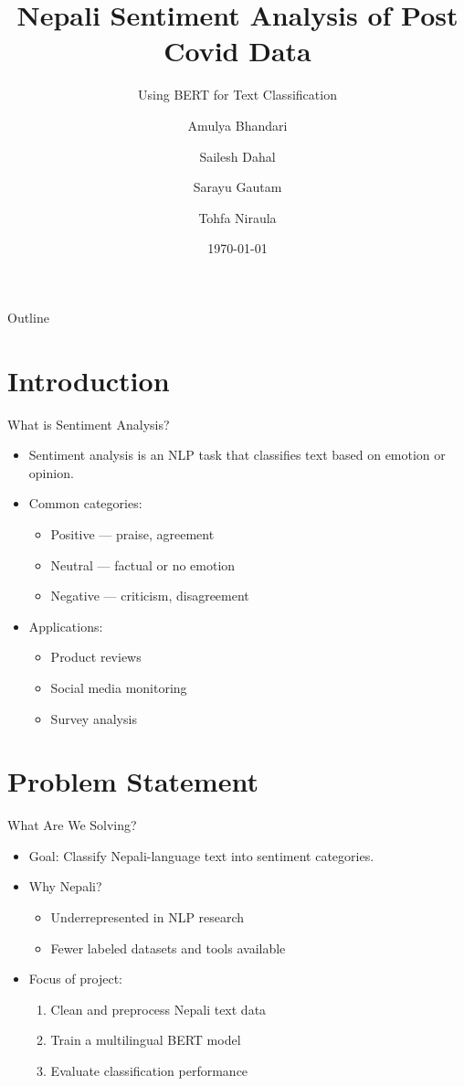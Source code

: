 \documentclass[aspectratio=169]{beamer}
\title{Nepali Sentiment Analysis of Post Covid Data}
\subtitle{Using BERT for Text Classification}
\author{Amulya Bhandari \and Sailesh Dahal \and Sarayu Gautam \and Tohfa Niraula}
\institute{Department of Computer Engineering\\Kathmandu University}
\date{\today}
\begin{document}
\maketitle

\begin{frame}{Outline}
  \tableofcontents
\end{frame}

\section{Introduction}
\begin{frame}{What is Sentiment Analysis?}
  \begin{itemize}
    \item Sentiment analysis is an NLP task that classifies text based on emotion or opinion.
    \item Common categories:
    \begin{itemize}
      \item Positive — praise, agreement
      \item Neutral — factual or no emotion
      \item Negative — criticism, disagreement
    \end{itemize}
    \item Applications:
    \begin{itemize}
      \item Product reviews
      \item Social media monitoring
      \item Survey analysis
    \end{itemize}
  \end{itemize}
\end{frame}

\section{Problem Statement}
\begin{frame}{What Are We Solving?}
  \begin{itemize}
    \item Goal: Classify Nepali-language text into sentiment categories.
    \item Why Nepali?
    \begin{itemize}
      \item Underrepresented in NLP research
      \item Fewer labeled datasets and tools available
    \end{itemize}
    \item Focus of project:
    \begin{enumerate}
      \item Clean and preprocess Nepali text data
      \item Train a multilingual BERT model
      \item Evaluate classification performance
    \end{enumerate}
  \end{itemize}
\end{frame}
\end{document}
